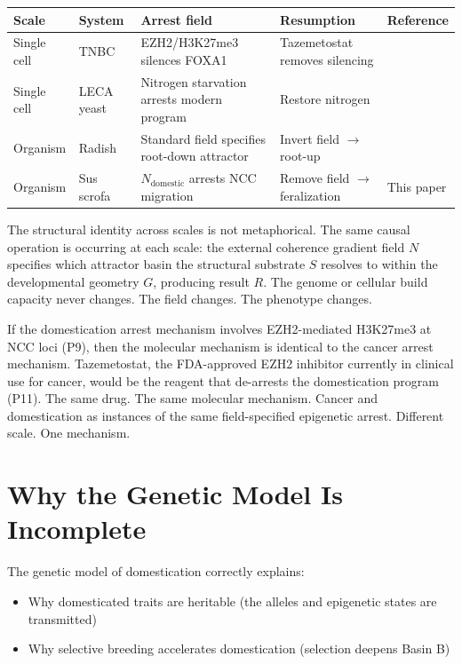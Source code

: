 \documentclass[11pt, a4paper]{article}
\begin{document}
\vspace{0.3em}
\begin{center}
\small
\begin{tabular}{p{2.2cm}p{2.8cm}p{2.8cm}p{2.8cm}p{2.2cm}}
\toprule
\textbf{Scale} & \textbf{System} &
\textbf{Arrest field} & \textbf{Resumption} &
\textbf{Reference} \\
\midrule
Single cell &
TNBC &
EZH2/H3K27me3 silences FOXA1 &
Tazemetostat removes silencing &
\cite{foxa1ezh2_2026} \\[0.4em]
Single cell &
LECA yeast &
Nitrogen starvation arrests modern program &
Restore nitrogen &
\cite{leca2026} \\[0.4em]
Organism &
Radish &
Standard field specifies root-down attractor &
Invert field $\rightarrow$ root-up &
\cite{plantinv2026} \\[0.4em]
Organism &
Sus scrofa &
$N_{\text{domestic}}$ arrests NCC migration &
Remove field $\rightarrow$ feralization &
This paper \\
\bottomrule
\end{tabular}
\end{center}

\vspace{0.3em}
The structural identity across scales is not
metaphorical. The same causal operation is occurring
at each scale: the external coherence gradient field
$N$ specifies which attractor basin the structural
substrate $S$ resolves to within the developmental
geometry $G$, producing result $R$. The genome or
cellular build capacity never changes. The field
changes. The phenotype changes.

If the domestication arrest mechanism involves
EZH2-mediated H3K27me3 at NCC loci (P9), then
the molecular mechanism is identical to the
cancer arrest mechanism. Tazemetostat, the
FDA-approved EZH2 inhibitor currently in
clinical use for cancer, would be the reagent
that de-arrests the domestication program (P11).
The same drug. The same molecular mechanism.
Cancer and domestication as instances of the same
field-specified epigenetic arrest. Different scale.
One mechanism.

\section{Why the Genetic Model Is Incomplete}
\label{sec:genetic}

The genetic model of domestication correctly explains:
\begin{itemize}[itemsep=0.1em]
  \item Why domesticated traits are heritable
    (the alleles and epigenetic states are transmitted)
  \item Why selective breeding accelerates
    domestication (selection deepens Basin B)
\end{itemize}
\end{document}
